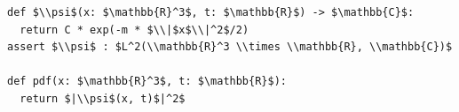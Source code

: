 \documentclass[border=10pt]{standalone}
\begin{document}
\begin{lstlisting}
def $\\psi$(x: $\mathbb{R}^3$, t: $\mathbb{R}$) -> $\mathbb{C}$:
  return C * exp(-m * $\\|$x$\\|^2$/2)
assert $\\psi$ : $L^2(\\mathbb{R}^3 \\times \\mathbb{R}, \\mathbb{C})$

def pdf(x: $\mathbb{R}^3$, t: $\mathbb{R}$):
  return $|\\psi$(x, t)$|^2$
\end{lstlisting}
\end{document}
